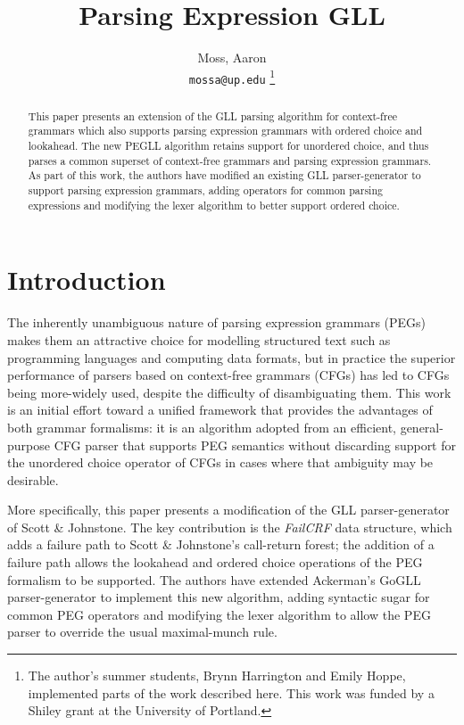 \documentclass{article}
\title{Parsing Expression GLL}
\author{
    Moss, Aaron\\
    \texttt{mossa@up.edu}
	\thanks{The author's summer students, Brynn Harrington and Emily Hoppe, implemented parts of the work described here. This work was funded by a Shiley grant at the University of Portland.}
}
\begin{document}
\maketitle

\begin{abstract}
This paper presents an extension of the GLL parsing algorithm for context-free grammars which also supports parsing expression grammars with ordered choice and lookahead. 
The new PEGLL algorithm retains support for unordered choice, and thus parses a common superset of context-free grammars and parsing expression grammars. 
As part of this work, the authors have modified an existing GLL parser-generator to support parsing expression grammars, adding operators for common parsing expressions and modifying the lexer algorithm to better support ordered choice. 
\end{abstract}

\section{Introduction}
The inherently unambiguous nature of parsing expression grammars (PEGs) makes them an attractive choice for modelling structured text such as programming languages and computing data formats, but in practice the superior performance of parsers based on context-free grammars (CFGs) has led to CFGs being more-widely used, despite the difficulty of disambiguating them. 
This work is an initial effort toward a unified framework that provides the advantages of both grammar formalisms: it is an algorithm adopted from an efficient, general-purpose CFG parser that supports PEG semantics without discarding support for the unordered choice operator of CFGs in cases where that ambiguity may be desirable. 

More specifically, this paper presents a modification of the GLL parser-generator of Scott \& Johnstone\cite{SJ10,SJ16}. 
The key contribution is the \emph{FailCRF} data structure, which adds a failure path to Scott \& Johnstone's call-return forest; the addition of a failure path allows the lookahead and ordered choice operations of the PEG formalism to be supported.
The authors have extended Ackerman's GoGLL\cite{Ack19} parser-generator to implement this new algorithm, adding syntactic sugar for common PEG operators and modifying the lexer algorithm to allow the PEG parser to override the usual maximal-munch rule. 
\end{document}
